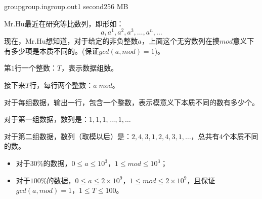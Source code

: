 \documentclass[11pt,a4paper,oneside]{article}
\begin{document}
\begin{problem}{group}{group.in}{group.out}{1 second}{256 MB}	
	
	Mr.Hu最近在研究等比数列，即形如：
	$$
		a, a^1, a^2, a^3, \dots, a^n, \dots
	$$
	现在，Mr.Hu想知道，对于给定的非负整数$a$，上面这个无穷数列在摸$mod$意义下有多少项是本质不同的。(保证$gcd(a,mod) = 1$)。
	
	\InputFile
	
	第$1$行一个整数：$T$，表示数据组数。
	
	接下来$T$行，每行两个整数：$a \; mod$。
	
	\OutputFile
	
	对于每组数据，输出一行，包含一个整数，表示模意义下本质不同的数有多少个。
	
	\Example
	
	\begin{example}
	\end{example}

	对于第一组数据，数列是：$1, 1, 1, \dots, 1, \dots$
	
	对于第二组数据，数列（取模以后）是：$2, 4, 3, 1, 2, 4, 3, 1, \dots$，总共有$4$个本质不同的数。
	
	\Note

	\begin{itemize}
		\item 对于$30\%$的数据，$0 \leq a \leq 10^3$，$1 \leq mod \leq 10^3$；
		\item 对于$100\%$的数据，$0 \leq a \leq 2 \times 10^9$，$1 \leq mod \leq 2 \times 10^9$，且保证$gcd(a,mod) = 1$，$1 \leq T \leq 100$。
	\end{itemize}

\end{problem}
\end{document}
